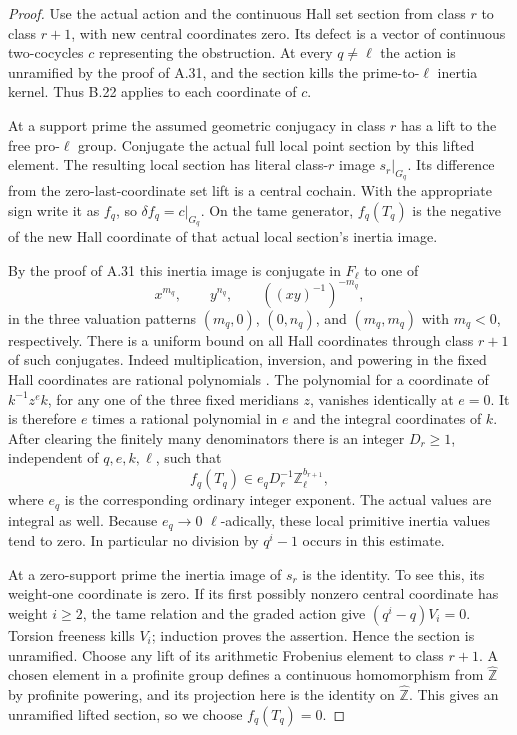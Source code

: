 \begin{proof}
Use the actual action and the continuous Hall set section from class
$r$ to class $r+1$, with new central coordinates zero. Its defect
is a vector of continuous two-cocycles $c$ representing the
obstruction. At every $q\ne\ell$ the action is unramified by
the proof of A.31, and the section kills the prime-to-$\ell$
inertia kernel. Thus B.22 applies to each coordinate of $c$.

At a support prime the assumed geometric conjugacy in class $r$
has a lift to the free pro-$\ell$ group. Conjugate the actual full
local point section by this lifted element. The resulting local
section has literal class-$r$ image $s_r|_{G_q}$. Its difference
from the zero-last-coordinate set lift is a central cochain. With
the appropriate sign write it as $f_q$, so $\delta f_q=c|_{G_q}$.
On the tame generator, $f_q(T_q)$ is the negative of the new Hall
coordinate of that actual local section's inertia image.

By the proof of A.31 this inertia image is conjugate in $F_\ell$
to one of
\[
 x^{m_q},\qquad y^{n_q},\qquad ((xy)^{-1})^{-m_q},
\]
in the three valuation patterns $(m_q,0)$, $(0,n_q)$, and
$(m_q,m_q)$ with $m_q<0$, respectively. There is a uniform
bound on all Hall coordinates through class $r+1$ of such
conjugates. Indeed multiplication, inversion, and powering in the
fixed Hall coordinates are rational polynomials
\cite[\S\S3--4]{CohCantEick2019}. The polynomial for a coordinate
of $k^{-1}z^e k$, for any one of the three fixed meridians $z$,
vanishes identically at $e=0$. It is therefore $e$ times a
rational polynomial in $e$ and the integral coordinates of $k$.
After clearing the finitely many denominators there is an integer
$D_r\geq1$, independent of $q,e,k,\ell$, such that
\[
       f_q(T_q)\in e_qD_r^{-1}\mathbb Z_\ell^{b_{r+1}},
\]
where $e_q$ is the corresponding ordinary integer exponent.
The actual values are integral as well. Because $e_q\to0$
$\ell$-adically, these local primitive inertia values tend to zero.
In particular no division by $q^i-1$ occurs in this estimate.

At a zero-support prime the inertia image of $s_r$ is the identity.
To see this, its weight-one coordinate is zero. If its first
possibly nonzero central coordinate has weight $i\geq2$, the
tame relation and the graded action give
$(q^i-q)V_i=0$. Torsion freeness kills $V_i$; induction proves
the assertion. Hence the section is unramified. Choose any lift of
its arithmetic Frobenius element to class $r+1$. A chosen element
in a profinite group defines a continuous homomorphism from
$\widehat{\mathbb Z}$ by profinite powering, and its projection
here is the identity on $\widehat{\mathbb Z}$. This gives an
unramified lifted section, so we choose $f_q(T_q)=0$.


\end{proof}
